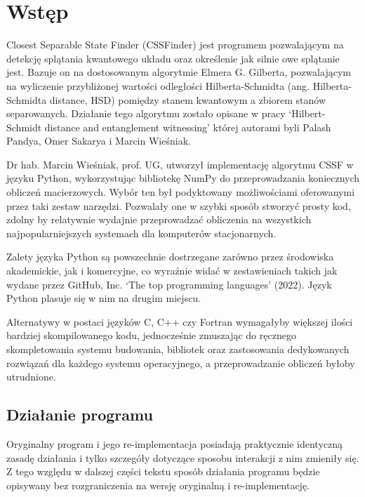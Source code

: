 \documentclass[11pt, a4paper]{article}
\begin{document}
  \begin{sloppypar}
    \section{Wstęp}
    Closest Separable State Finder (CSSFinder) jest programem pozwalającym na detekcję splątania
    kwantowego układu oraz określenie jak silnie owe splątanie jest. Bazuje on na
    dostosowanym algorytmie Elmera G. Gilberta\cite{Lindemann_Gilbert}, pozwalającym na wyliczenie
    przybliżonej wartości odległości Hilberta-Schmidta (ang. Hilberta-Schmidta distance,
    HSD) pomiędzy stanem kwantowym a zbiorem stanów separowanych. Działanie tego
    algorytmu zostało opisane w pracy `Hilbert-Schmidt distance and entanglement witnessing'
    której autorami byli Palash Pandya, Omer Sakarya i Marcin Wieśniak\cite{MW_Hilbert_Schmidt_distance}.

    Dr hab. Marcin Wieśniak, prof. UG, utworzył implementację algorytmu CSSF w języku
    Python, wykorzystując bibliotekę NumPy do przeprowadzania koniecznych obliczeń macierzowych.
    Wybór ten był podyktowany możliwościami oferowanymi przez taki zestaw narzędzi. Pozwalały
    one w szybki sposób stworzyć prosty kod, zdolny by relatywnie wydajnie przeprowadzać
    obliczenia na wszystkich najpopularniejszych systemach dla komputerów stacjonarnych.

    Zalety języka Python są powszechnie dostrzegane zarówno przez środowiska akademickie,
    jak i komercyjne, co wyraźnie widać w zestawieniach takich jak wydane przez GitHub, Inc.
    `The top programming languages' (2022)\cite{GitHub_Top_languages}. Język Python
    plasuje się w nim na drugim miejscu.

    Alternatywy w postaci języków C, C++ czy Fortran wymagałyby większej ilości bardziej
    skompilowanego kodu, jednocześnie zmuszając do ręcznego skompletowania systemu
    budowania, bibliotek oraz zastosowania dedykowanych rozwiązań dla każdego systemu operacyjnego,
    a przeprowadzanie obliczeń byłoby utrudnione.

    \subsection{Działanie programu}


    Oryginalny program i jego re-implementacja posiadają praktycznie identyczną zasadę
    działania i tylko szczegóły dotyczące sposobu interakcji z nim zmieniły się. Z tego względu
    w dalszej części tekstu sposób działania programu będzie opisywany bez rozgraniczenia
    na wersję oryginalną i re-implementację.


\end{sloppypar}
\end{document}
